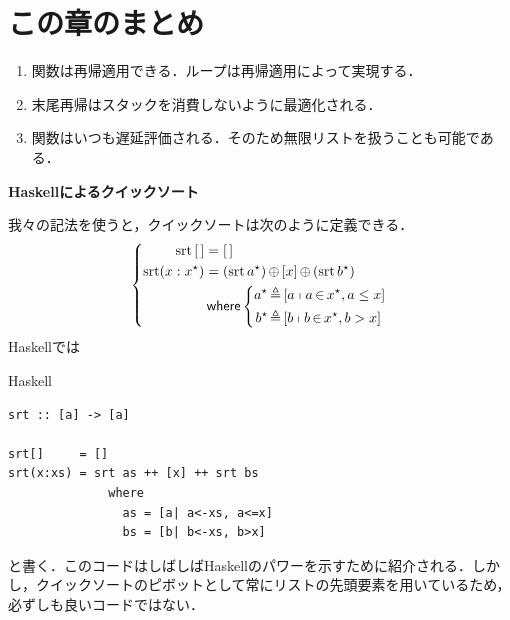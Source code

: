 \documentclass[a4paper,twocolumn]{jsbook}
\newcommand{\programminglanguage}[1]{\textsf{#1}}
\newcommand{\haskell}{\programminglanguage{Haskell}}
\newenvironment{note}[1]{\begin{boxnote}\begin{center}\textbf{#1}\end{center}}{\end{boxnote}}
\newenvironment{haskellcode}{\begin{itembox}[r]{\haskell}}{\end{itembox}}
\newcommand{\mKeyword}[1]{\mathsf{#1}} %
\newcommand{\mWhereKeyword}{\mKeyword{where}}
\DeclareMathOperator{\mWhere}{\mWhereKeyword}
\newcommand{\mEmptyList}{{[\,]}}
\newcommand{\mSpecialFunc}[1]{\mathrm{#1}}
\DeclareMathOperator{\mSort}{\mSpecialFunc{srt}}
\DeclareMathOperator{\mAppend}{\oplus}
\DeclareMathOperator{\mFrom}{\in}
\DeclareMathOperator{\mLetEq}{\triangleq}
\newcommand{\mListWith}[1]{\left[#1\right]}
\newcommand{\mList}[1]{{#1}^\mathrm{\star}}
\newcommand{\mListComp}[1]{\shortmid#1}
\begin{document}





\section{この章のまとめ}

\begin{enumerate}
\item 関数は再帰適用できる．ループは再帰適用によって実現する．
\item 末尾再帰はスタックを消費しないように最適化される．
\item 関数はいつも遅延評価される．そのため無限リストを扱うことも可能である．
\end{enumerate}

\begin{note}{\haskell によるクイックソート}
我々の記法を使うと，クイックソートは次のように定義できる．
\begin{equation*}
\left\{
\begin{aligned}
\mSort\mEmptyList
  &=\mEmptyList\\
\mSort(x:\mList{x})
  &=(\mSort\mList{a})\mAppend\mListWith{x}\mAppend{}(\mSort\mList{b})\\
&\mWhere
\left\{
\begin{aligned}
\mList{a}&\mLetEq\mListWith{a\mListComp{a\mFrom\mList{x},a\le x}}\\
\mList{b}&\mLetEq\mListWith{b\mListComp{b\mFrom\mList{x},b>x}}
\end{aligned}
\right.
\end{aligned}
\right.
\end{equation*}
\haskell では
\begin{haskellcode}
\begin{verbatim}
srt :: [a] -> [a]

srt[]     = []
srt(x:xs) = srt as ++ [x] ++ srt bs
              where
                as = [a| a<-xs, a<=x]
                bs = [b| b<-xs, b>x]
\end{verbatim}
\end{haskellcode}
と書く．このコードはしばしば\haskell のパワーを示すために紹介される．しかし，クイックソートのピボットとして常にリストの先頭要素を用いているため，必ずしも良いコードではない．
\end{note}
\end{document}
